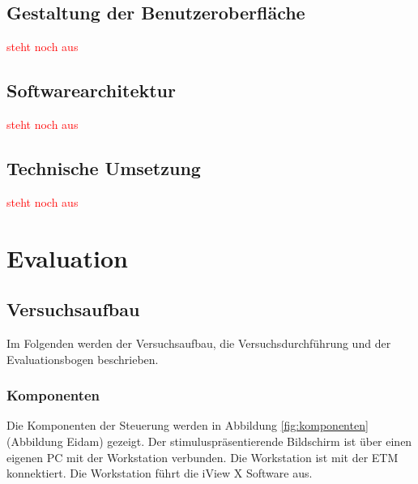 \section{Gestaltung der Benutzeroberfläche}
\textcolor{red}{steht noch aus}

\section{Softwarearchitektur}
\label{section:architektur}

\textcolor{red}{steht noch aus}
\section{Technische Umsetzung}
\textcolor{red}{steht noch aus}

\chapter{Evaluation}
\label{chapter:evaluation}

\section{Versuchsaufbau}
\label{section:versuchsaufbau}
Im Folgenden werden der Versuchsaufbau, die Versuchsdurchführung und der Evaluationsbogen beschrieben.

\subsection{Komponenten}
Die Komponenten der Steuerung werden in Abbildung \ref{fig:komponenten} (Abbildung Eidam) gezeigt. Der stimuluspräsentierende Bildschirm ist über einen eigenen PC mit der Workstation verbunden. Die Workstation ist mit der ETM konnektiert. Die Workstation führt die iView X Software aus. 

